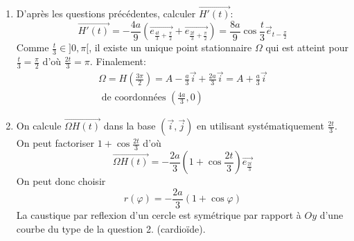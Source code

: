 \begin{enumerate}
\begin{enumerate}
\item D'après les questions précédentes, calculer $\overrightarrow{H'(t)}$:
\begin{displaymath}
\overrightarrow{H'(t)}
=-\frac{4a}{9}
\left( 
  \overrightarrow{e_{\frac{4t}{3}+\frac{\pi}{2}}} + \overrightarrow{e_{\frac{2t}{3}+\frac{\pi}{2}}}
\right) 
=\frac{8a}{9}\cos \frac{t}{3}\overrightarrow{e}_{t-\frac{\pi}{2}} 
\end{displaymath}
Comme $\frac{t}{3}\in ]0,\pi[$, il existe un unique point stationnaire $\Omega$ qui est atteint pour $\frac{t}{3}=\frac{\pi}{2}$ d'où $\frac{2t}{3}=\pi$. Finalement:
\begin{multline*}
\Omega = H(\frac{3\pi}{2}) 
= A -\frac{a}{3}\overrightarrow i + \frac{2a}{3}\overrightarrow i 
= A + \frac{a}{3}\overrightarrow i \\
\text{ de coordonnées } (\frac{4a}{3},0) 
\end{multline*}

\item On calcule $\overrightarrow{\Omega H(t)}$ dans la base $(\overrightarrow{i},\overrightarrow{j})$ en utilisant systématiquement $\frac{2t}{3}$. On peut factoriser $1+\cos \frac{2t}{3}$ d'où
\[\overrightarrow{\Omega H(t)}=-\frac{2a}{3}(1+\cos \frac{2t}{3})\overrightarrow{e_{\frac{2t}{3}}}\]
On peut donc choisir
\[r(\varphi)=-\frac{2a}{3}(1+\cos \varphi)\]
La caustique par reflexion d'un cercle est symétrique par rapport à $Oy$ d'une courbe du type de la question 2. (cardioïde).
\end{enumerate}
\end{enumerate}

